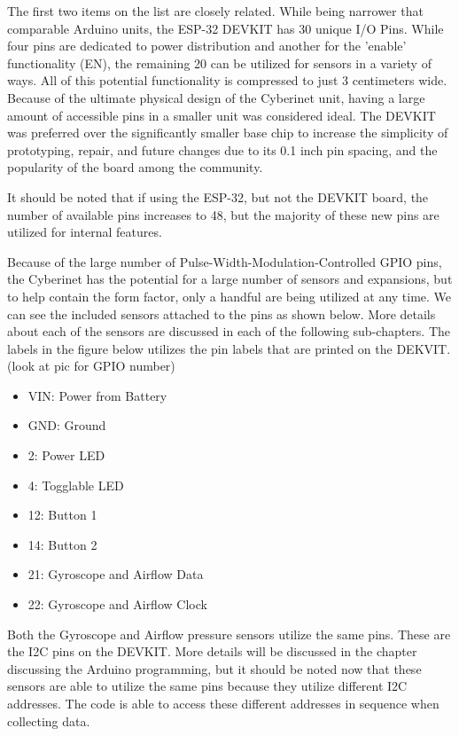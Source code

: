 The first two items on the list are closely related. While being narrower that comparable Arduino units, the ESP-32 DEVKIT has 30 unique I/O Pins. While four pins are dedicated to power distribution and another for the 'enable' functionality (EN), the remaining 20 can be utilized for sensors in a variety of ways. All of this potential functionality is compressed to just 3 centimeters wide. Because of the ultimate physical design of the Cyberinet unit, having a large amount of accessible pins in a smaller unit was considered ideal. The DEVKIT was preferred over the significantly smaller base chip to increase the simplicity of prototyping, repair, and future changes due to its 0.1 inch pin spacing, and the popularity of the board among the community.

It should be noted that if using the ESP-32, but not the DEVKIT board, the number of available pins increases to 48, but the majority of these new pins are utilized for internal features. 

Because of the large number of Pulse-Width-Modulation-Controlled GPIO pins, the Cyberinet has the potential for a large number of sensors and expansions, but to help contain the form factor, only a handful are being utilized at any time. We can see the included sensors attached to the pins as shown below. More details about each of the sensors are discussed in each of the following sub-chapters. The labels in the figure below utilizes the pin labels that are printed on the DEKVIT. (look at pic for GPIO number)

\begin{itemize}
    \item VIN: Power from Battery
    \item GND: Ground
    \item 2: Power LED
    \item 4: Togglable LED
    \item 12: Button 1
    \item 14: Button 2
    \item 21: Gyroscope and Airflow Data
    \item 22: Gyroscope and Airflow Clock
\end{itemize}

Both the Gyroscope and Airflow pressure sensors utilize the same pins. These are the I2C pins on the DEVKIT. More details will be discussed in the chapter discussing the Arduino programming, but it should be noted now that these sensors are able to utilize the same pins because they utilize different I2C addresses. The code is able to access these different addresses in sequence when collecting data.

